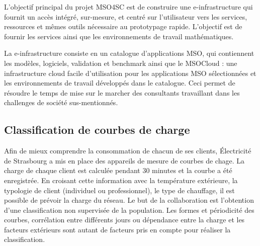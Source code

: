 \documentclass[12pt,a4paper]{article}
\begin{document}
L'objectif principal du projet MSO4SC est de construire une e-infrastructure qui fournit un accès intégré, sur-mesure, et centré sur l'utilisateur vers les services, ressources et mêmes outils nécessaire au prototypage rapide. L'objectif est de fournir les services ainsi que les environnements de travail mathématiques.

La e-infrastructure consiste en un catalogue d'applications MSO, qui contiennent les modèles, logiciels, validation et benchmark ainsi que le MSOCloud : une infrastructure cloud facile d'utilisation pour les applications MSO sélectionnées et les environnements de travail développés dans le catalogue.
Ceci permet de résoudre le temps de mise sur le marcher des consultants travaillant dans les challenges de société sus-mentionnés.



\subsection*{Classification de courbes de charge}

Afin de mieux comprendre la consommation de chacun de ses clients, Électricité de Strasbourg a mis en place des appareils de mesure de courbes de chage. La charge de chaque client est calculée pendant 30 minutes et la courbe a été enregistrée. En croisant cette information avec la température extérieure, la typologie de client (individuel ou professionnel), le type de chauffage, il est possible de prévoir la charge du réseau.
Le but de la collaboration est l'obtention d'une classification non supervisée de la population.
Les formes et périodicité des courbes, corrélation entre différents jours ou dépendance entre la charge et les facteurs extérieurs sont autant de facteurs pris en compte pour réaliser la classification.
\end{document}
